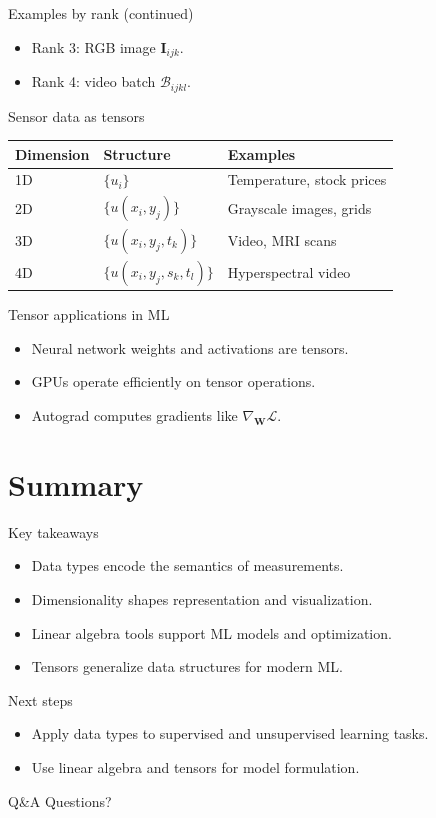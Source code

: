 \documentclass[12pt]{beamer}
\begin{document}
\begin{frame}{Examples by rank (continued)}
  \begin{itemize}
    \item Rank 3: RGB image $\bm{I}_{ijk}$.
    \item Rank 4: video batch $\mathcal{B}_{ijkl}$.
  \end{itemize}
\end{frame}

\begin{frame}{Sensor data as tensors}
  \scriptsize
  \renewcommand{\arraystretch}{1.2}
  \setlength{\tabcolsep}{4pt}
  \centering
  \begin{tabular}{|p{2.0cm}|p{3.0cm}|p{}|}
    \hline
    Dimension & Structure & Examples \\
    \hline
    1D & $\{u_i\}$ & Temperature, stock prices \\
    2D & $\{u(x_i, y_j)\}$ & Grayscale images, grids \\
    3D & $\{u(x_i, y_j, t_k)\}$ & Video, MRI scans \\
    4D & $\{u(x_i, y_j, s_k, t_l)\}$ & Hyperspectral video \\
    \hline
  \end{tabular}
\end{frame}

\begin{frame}{Tensor applications in ML}
  \begin{itemize}
    \item Neural network weights and activations are tensors.
    \item GPUs operate efficiently on tensor operations.
    \item Autograd computes gradients like $\nabla_{\bm{W}} \mathcal{L}$.
  \end{itemize}
\end{frame}

\section{Summary}

\begin{frame}{Key takeaways}
  \begin{itemize}
    \item Data types encode the semantics of measurements.
    \item Dimensionality shapes representation and visualization.
    \item Linear algebra tools support ML models and optimization.
    \item Tensors generalize data structures for modern ML.
  \end{itemize}
\end{frame}

\begin{frame}{Next steps}
  \begin{itemize}
    \item Apply data types to supervised and unsupervised learning tasks.
    \item Use linear algebra and tensors for model formulation.
  \end{itemize}
\end{frame}

\begin{frame}{Q\&A}
  \centering
  Questions?
\end{frame}
\end{document}

